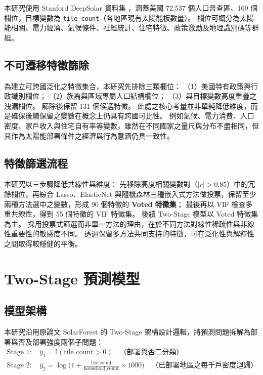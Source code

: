 \documentclass[12pt, a4paper]{article}
\newcommand{\eqbefore}{\vspace{0.5\baselineskip}}
\newcommand{\eqafter}{\vspace{0.5\baselineskip}}
\begin{document}
本研究使用 Stanford DeepSolar 資料集 \citep{dubey2021deepsolar}，涵蓋美國 72,537 個人口普查區、169 個欄位，目標變數為 \texttt{tile\_count}（各地區現有太陽能板數量）。
欄位可概分為太陽能相關、電力經濟、氣候條件、社經統計、住宅特徵、政策激勵及地理識別碼等群組。

\subsection{不可遷移特徵篩除}

為建立可跨國泛化之特徵集合，本研究先排除三類欄位：
（1）美國特有政策與行政識別欄位；
（2）族裔與區域專屬人口結構欄位；
（3）與目標變數高度重疊之洩漏欄位。
篩除後保留 131 個候選特徵。
此處之核心考量並非單純降低維度，而是確保後續保留之變數在概念上仍具有跨國可比性。
例如氣候、電力消費、人口密度、家戶收入與住宅自有率等變數，雖然在不同國家之量尺與分布不盡相同，但其作為太陽能部署條件之經濟與行為意涵仍具一致性。

\subsection{特徵篩選流程}

本研究以三步驟降低共線性與維度：
先移除高度相關變數對（$|r|>0.85$）中的冗餘欄位，再綜合 Lasso、ElasticNet 與隨機森林三種嵌入式方法做投票，保留至少兩種方法選中之變數，形成 90 個特徵的 \textbf{Voted 特徵集}；
最後再以 VIF 檢查多重共線性，得到 55 個特徵的 VIF 特徵集。
後續 Two-Stage 模型以 Voted 特徵集為主。
採用投票式篩選而非單一方法的理由，在於不同方法對線性稀疏性與非線性重要性的敏感度不同。
透過保留多方法共同支持的特徵，可在泛化性與解釋性之間取得較穩健的平衡。

\section{Two-Stage 預測模型}

\subsection{模型架構}

本研究沿用原論文 SolarForest 的 Two-Stage 架構設計邏輯，將預測問題拆解為部署與否及部署強度兩個子問題：
\eqbefore
\begin{align}
\text{Stage 1: } & \hat{y}_1 = \mathbb{I}(\text{tile\_count} > 0) \quad \text{（部署與否二分類）} \\
\text{Stage 2: } & \hat{y}_2 = \log\bigl(1 + \tfrac{\text{tile\_count}}{\text{household\_count}} \times 1000\bigr) \quad \text{（已部署地區之每千戶密度迴歸）}
\end{align}
\eqafter
\end{document}
